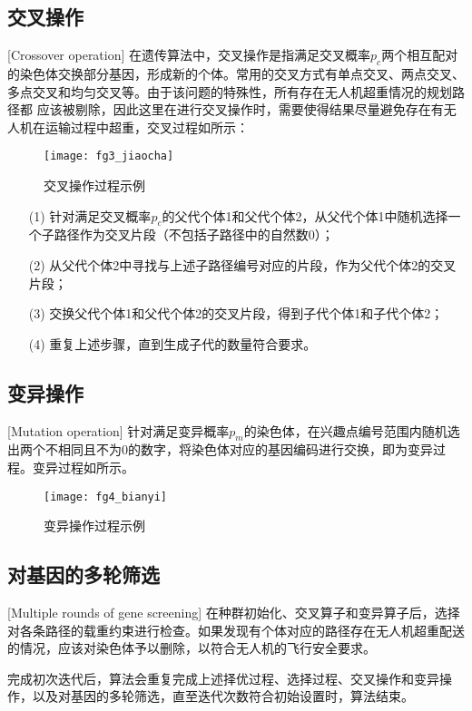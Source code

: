 \subsection{交叉操作}[Crossover operation]
在遗传算法中，交叉操作是指满足交叉概率$p_c$两个相互配对的染色体交换部分基因，形成新的个体。常用的交叉方式有单点交叉、两点交叉、多点交叉和均匀交叉等。由于该问题的特殊性，所有存在无人机超重情况的规划路径都
应该被剔除，因此这里在进行交叉操作时，需要使得结果尽量避免存在有无人机在运输过程中超重，交叉过程如所示：
\begin{figure}[ht]
	\centering
	\texttt{[image: fg3\_jiaocha]}
	\caption{交叉操作过程示例}
	\label{fg401}
\end{figure}


\begin{itemize}
	\item [(1)] 针对满足交叉概率$p_c$的父代个体1和父代个体2，从父代个体1中随机选择一个子路径作为交叉片段（不包括子路径中的自然数0）；
	\item [(2)] 从父代个体2中寻找与上述子路径编号对应的片段，作为父代个体2的交叉片段；
	\item [(3)] 交换父代个体1和父代个体2的交叉片段，得到子代个体1和子代个体2；
 	\item [(4)] 重复上述步骤，直到生成子代的数量符合要求。
\end{itemize}

\subsection{变异操作}[Mutation operation]
针对满足变异概率$p_m$的染色体，在兴趣点编号范围内随机选出两个不相同且不为0的数字，将染色体对应的基因编码进行交换，即为变异过程。变异过程如所示。
\begin{figure}[ht]
	\centering
	\texttt{[image: fg4\_bianyi]}
	\caption{变异操作过程示例}
	\label{fg402}
\end{figure}
\subsection{对基因的多轮筛选}[Multiple rounds of gene screening]
在种群初始化、交叉算子和变异算子后，选择对各条路径的载重约束进行检查。如果发现有个体对应的路径存在无人机超重配送的情况，应该对染色体予以删除，以符合无人机的飞行安全要求。


完成初次迭代后，算法会重复完成上述择优过程、选择过程、交叉操作和变异操作，以及对基因的多轮筛选，直至迭代次数符合初始设置时，算法结束。


